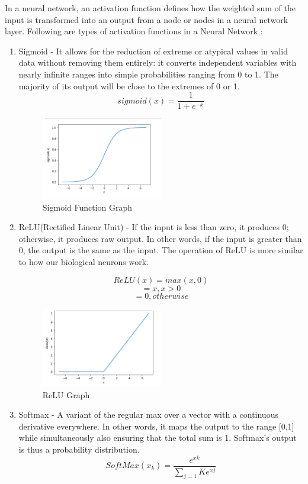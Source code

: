 In a neural network, an activation function defines how the weighted sum of the input is transformed into an output from a node or nodes in a neural network layer. Following are types of activation functions in a Neural Network \cite{backstrom_introduction_2022}:
\begin{enumerate}
    \item Sigmoid - It allows for the reduction of extreme or atypical values in valid data without removing them entirely: it converts independent variables with nearly infinite ranges into simple probabilities ranging from 0 to 1. The majority of its output will be close to the extremes of 0 or 1.
    \begin{equation}
        sigmoid(x)=\frac{1}{1+e^{-x}}     \end{equation}
    \begin{figure}[h!]
        \centering
        \includegraphics[width=0.5\textwidth]{img/sigmoid.png}
        \caption{Sigmoid Function Graph}
        \label{fig:sigmoid-graphl}
    \end{figure}
    \item ReLU(Rectified Linear Unit) - If the input is less than zero, it produces 0; otherwise, it produces raw output. In other words, if the input is greater than 0, the output is the same as the input. The operation of ReLU is more similar to how our biological neurons work. 
        
        $$ReLU(x)=max(x,0)$$
        $$=x,x>0$$
        $$=0,otherwise$$
     
    \begin{figure}[h!]
        \centering
        \includegraphics[width=0.5\textwidth]{img/RELU.png}
        \caption{ReLU Graph}
        \label{fig:Relu-graph}
    \end{figure}
    \item Softmax - A variant of the regular max over a vector with a continuous derivative everywhere. In other words, it maps the output to the range [0,1] while simultaneously also ensuring that the total sum is 1. Softmax's output is thus a probability distribution.
    \begin{equation}
      SoftMax(x_{k})=\frac{e^{xk}}{\sum_{j=1}{K}e^{xj}}    
    \end{equation}
    

\end{enumerate}
